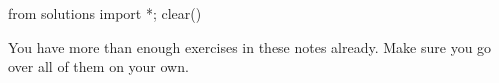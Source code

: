 \begin{python0}
from solutions import *; clear()
\end{python0}

You have more than enough exercises in these notes already. Make sure
you go over all of them on your own.

